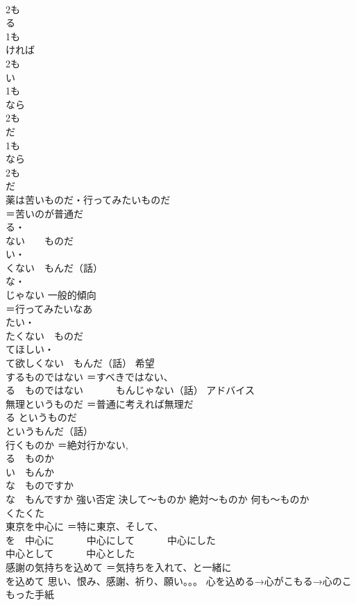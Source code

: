\documentclass[8pt]{extreport}
\begin{document}
\begin{CJK}{UTF8}{min}
\\	2も
\\	る 
\\	1も
\\	ければ
\\	2も
\\	い 
\\	1も
\\	なら
\\	2も
\\	だ 
\\	1も
\\	なら
\\	2も
\\	だ
\\	薬は苦いものだ・行ってみたいものだ	
\\	＝苦いのが普通だ 
\\	る・
\\	ない　　ものだ 
\\	い・
\\	くない　もんだ（話） 
\\	な・
\\	じゃない 一般的傾向 
\\	＝行ってみたいなあ 
\\	たい・
\\	たくない　ものだ 
\\	てほしい・
\\	て欲しくない　もんだ（話） 希望
\\	するものではない	＝すベきではない、
\\	る　ものではない 　　　もんじゃない（話） アドバイス
\\	無理というものだ	＝普通に考えれば無理だ 
\\	る というものだ 
\\	というもんだ（話） 
\\	行くものか	＝絶対行かない, 
\\	る　ものか 
\\	い　もんか 
\\	な　ものですか 
\\	な　もんですか 強い否定 決して〜ものか 絶対〜ものか 何も〜ものか
\\	くたくた	
\\	東京を中心に	＝特に東京、そして、
\\	を　中心に 　　　中心にして 　　　中心にした
\\	中心として 　　　中心とした
\\	感謝の気持ちを込めて	＝気持ちを入れて、と一緒に 
\\	を込めて 思い、恨み、感謝、祈り、願い。。。 心を込める→心がこもる→心のこもった手紙

\end{CJK}
\end{document}
